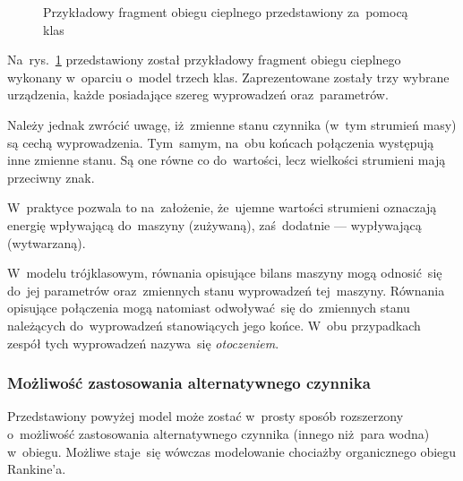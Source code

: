 \begin{figure}[h]

	\caption{Przykładowy fragment obiegu cieplnego przedstawiony
		za~pomocą klas}
	\label{klasy-przykl}
\end{figure}

Na~rys.~\ref{klasy-przykl} przedstawiony został przykładowy fragment
obiegu cieplnego wykonany w~oparciu o~model trzech klas. Zaprezentowane
zostały trzy wybrane urządzenia, każde posiadające szereg wyprowadzeń
oraz~parametrów.

Należy jednak zwrócić uwagę, iż~zmienne stanu czynnika (w~tym strumień
masy) są cechą wyprowadzenia. Tym~samym, na~obu końcach połączenia
występują inne zmienne stanu. Są one równe co do~wartości, lecz
wielkości strumieni mają przeciwny znak.

W~praktyce pozwala to na~założenie, że~ujemne wartości strumieni
oznaczają energię wpływającą do~maszyny (zużywaną), zaś~dodatnie ---
wypływającą (wytwarzaną).

W~modelu trójklasowym, równania opisujące bilans maszyny mogą
odnosić~się do~jej parametrów oraz~zmiennych stanu wyprowadzeń
tej~maszyny. Równania opisujące połączenia mogą natomiast odwoływać~się
do~zmiennych stanu należących do~wyprowadzeń stanowiących jego końce.
W~obu przypadkach zespół tych wyprowadzeń nazywa~się
\textit{otoczeniem}.


\subsubsection{Możliwość zastosowania alternatywnego czynnika}

Przedstawiony powyżej model może zostać w~prosty sposób rozszerzony
o~możliwość zastosowania alternatywnego czynnika (innego niż~para wodna)
w~obiegu. Możliwe staje~się wówczas modelowanie chociażby organicznego
obiegu Rankine'a.

